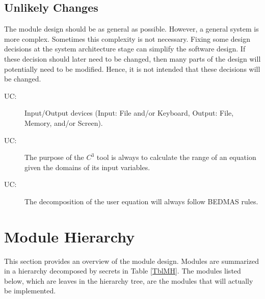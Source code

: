 \documentclass[12pt, titlepage]{article}
\newcounter{ucnum}
\newcommand{\uctheucnum}{UC\theucnum}
\newcommand{\prognameAbbrv}{$C^{3}$}
\begin{document}
\subsection{Unlikely Changes} \label{SecUchange}

The module design should be as general as possible. However, a general system is
more complex. Sometimes this complexity is not necessary. Fixing some design
decisions at the system architecture stage can simplify the software design. If
these decision should later need to be changed, then many parts of the design
will potentially need to be modified. Hence, it is not intended that these
decisions will be changed.

\begin{description}
\item[ \uctheucnum \label{ucIO}:] Input/Output devices
  (Input: File and/or Keyboard, Output: File, Memory, and/or Screen).

\item[ \uctheucnum \label{ucPurpose}:] The purpose of the 
\prognameAbbrv{} tool is always to calculate the range of an equation given the 
domains of its input variables.

\item[ \uctheucnum \label{ucDecomposing}:] The 
decomposition of the user equation will always follow BEDMAS rules.

\end{description}

\section{Module Hierarchy} \label{SecMH}

This section provides an overview of the module design. Modules are summarized
in a hierarchy decomposed by secrets in Table \ref{TblMH}. The modules listed
below, which are leaves in the hierarchy tree, are the modules that will
actually be implemented.
\end{document}
